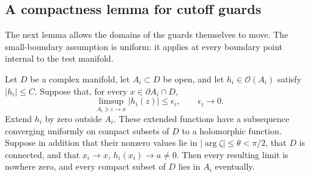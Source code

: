 \subsection{A compactness lemma for cutoff guards}

The next lemma allows the domains of the guards themselves to move.
The small-boundary assumption is uniform: it applies at every
boundary point internal to the test manifold.

\begin{lemma}\label{quo:cutoff-normal}
Let \(D\) be a complex manifold, let \(A_i\subset D\) be open,
and let \(h_i\in\mathcal O(A_i)\) satisfy \(|h_i|\leq C\).
Suppose that, for every \(x\in\partial A_i\cap D\),
\[
 \limsup_{A_i\ni z\to x}|h_i(z)|\leq\epsilon_i,
 \qquad \epsilon_i\longrightarrow0.
\]
Extend \(h_i\) by zero outside \(A_i\). These extended functions
have a subsequence converging uniformly on compact subsets of
\(D\) to a holomorphic function. Suppose in addition that their
nonzero values lie in \(|\arg\zeta|\leq\theta<\pi/2\), that
\(D\) is connected, and that
\(x_i\to x\), \(h_i(x_i)\to a\ne0\). Then every resulting
limit is nowhere zero, and every compact subset of \(D\) lies
in \(A_i\) eventually.
\end{lemma}
